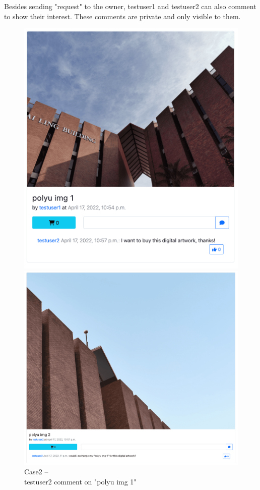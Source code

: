 Besides sending "request" to the owner, testuser1 and testuser2 can also comment to show their interest. These comments are private and only visible to them.

\begin{figure}[!h]
    \centering
    \begin{minipage}{.5\textwidth}
        \centering
        \includegraphics[width=\linewidth, height=\linewidth]{figures/case2-3.png}
        \caption{Case2 -- \\ testuser2 comment on "polyu img 1"}
        \label{fig: case2-1}
    \end{minipage}%
    \begin{minipage}{0.5\textwidth}
        \centering
        \includegraphics[width=\linewidth, height=\linewidth]{figures/case2-4.png}

\end{minipage}
\end{figure}
